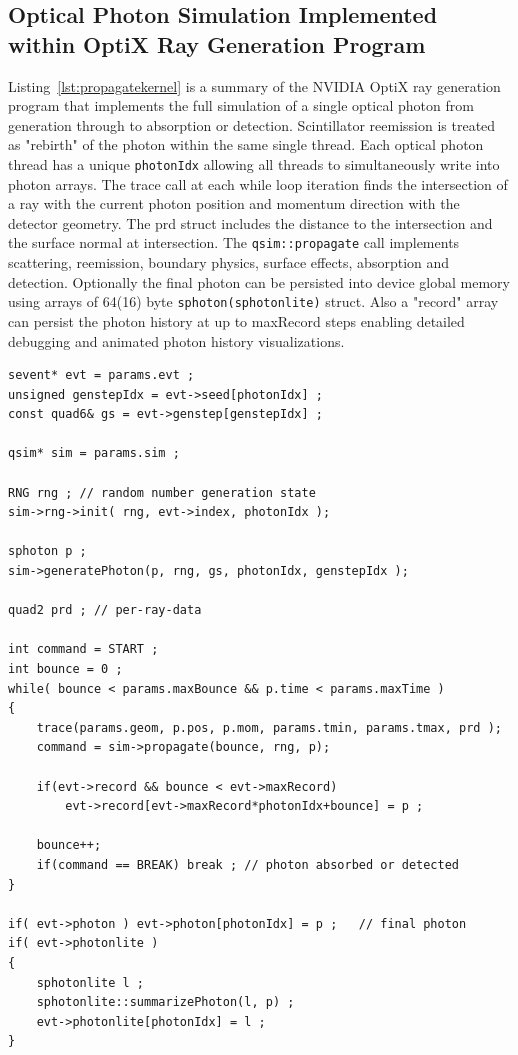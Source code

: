 \documentclass{webofc}
\begin{document}
\newpage
\subsection{Optical Photon Simulation Implemented within OptiX Ray Generation Program}
\label{sec:kernel}
\begin{samepage}
%
Listing~\ref{lst:propagatekernel} is a summary of the NVIDIA OptiX ray generation program
that implements the full simulation of a single optical photon from generation through
to absorption or detection. Scintillator reemission is treated as "rebirth" 
of the photon within the same single thread. Each optical photon thread has a unique {\tt photonIdx}
allowing all threads to simultaneously write into photon arrays.
%
The trace call at each while loop iteration
finds the intersection of a ray with the current photon position and momentum direction
with the detector geometry. The prd struct includes the distance to the intersection 
and the surface normal at intersection. The {\tt qsim::propagate} call implements
scattering, reemission, boundary physics, surface effects, absorption and detection.  
Optionally the final photon can be persisted into device global memory using
arrays of 64(16) byte {\tt sphoton(sphotonlite)} struct.
Also a "record" array can persist the photon history at up to maxRecord steps enabling
detailed debugging and animated photon history visualizations.   
%
\begin{lstlisting}[numbers=none, caption={Optical photon simulation implemented within NVIDIA OptiX ray generation program.}, label={lst:propagatekernel}]
sevent* evt = params.evt ;
unsigned genstepIdx = evt->seed[photonIdx] ;
const quad6& gs = evt->genstep[genstepIdx] ;

qsim* sim = params.sim ;

RNG rng ; // random number generation state 
sim->rng->init( rng, evt->index, photonIdx );

sphoton p ;
sim->generatePhoton(p, rng, gs, photonIdx, genstepIdx );

quad2 prd ; // per-ray-data

int command = START ;
int bounce = 0 ; 
while( bounce < params.maxBounce && p.time < params.maxTime )
{   
    trace(params.geom, p.pos, p.mom, params.tmin, params.tmax, prd );
    command = sim->propagate(bounce, rng, p);

    if(evt->record && bounce < evt->maxRecord) 
        evt->record[evt->maxRecord*photonIdx+bounce] = p ;

    bounce++;
    if(command == BREAK) break ; // photon absorbed or detected
}   

if( evt->photon ) evt->photon[photonIdx] = p ;   // final photon
if( evt->photonlite )
{   
    sphotonlite l ;
    sphotonlite::summarizePhoton(l, p) ; 
    evt->photonlite[photonIdx] = l ;
}   
\end{lstlisting}
\end{samepage}
%
\end{document}
